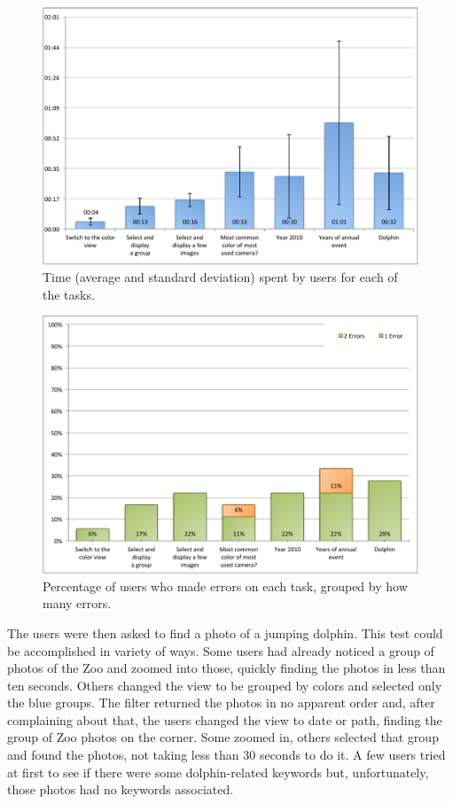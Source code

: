 \begin{figure}[p]
	\centering
		\includegraphics[width=0.9\linewidth]{Figures/tasks-graphs-time}
	\caption[Graph of time spent on each task]{Time (average and standard deviation) spent by users for each of the tasks.}
	\label{fig:tasks:graph:time}
\end{figure}

\begin{figure}[p]
	\centering
		\includegraphics[width=0.9\linewidth]{Figures/tasks-graphs-errors}
	\caption[Graph of errors made on each task]{Percentage of users who made errors on each task, grouped by how many errors.}
	\label{fig:tasks:graph:errors}
\end{figure}

The users were then asked to find a photo of a jumping dolphin. This test could be accomplished in variety of ways. Some users had already noticed a group of photos of the Zoo and zoomed into those, quickly finding the photos in less than ten seconds. Others changed the view to be grouped by colors and selected only the blue groups. The filter returned the photos in no apparent order and, after complaining about that, the users changed the view to date or path, finding the group of Zoo photos on the corner. Some zoomed in, others selected that group and found the photos, not taking less than 30 seconds to do it. A few users tried at first to see if there were some dolphin-related keywords but, unfortunately, those photos had no keywords associated.









